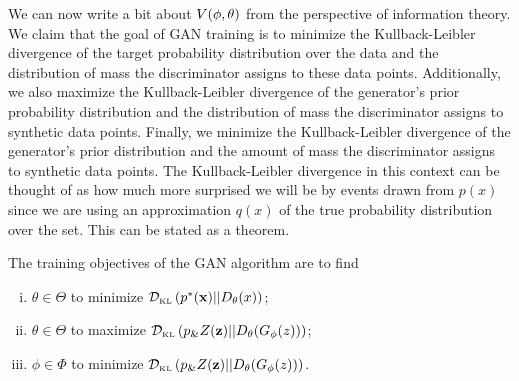We can now write a bit about $V(\phi, \theta)$ from the perspective of information
theory. We claim that the goal of GAN training is to minimize the
Kullback-Leibler divergence of the target probability distribution
over the data and the distribution of mass the discriminator assigns
to these data points.  Additionally, we also maximize the
Kullback-Leibler divergence of the generator's prior probability
distribution and the distribution of mass the discriminator assigns to
synthetic data points. Finally, we minimize the Kullback-Leibler
divergence of the generator's prior distribution and the amount of
mass the discriminator assigns to synthetic data points.  The
Kullback-Leibler divergence in this context can be thought of as how
much more surprised we will be by events drawn from $p(x)$ since we
are using an approximation $q(x)$ of the true probability distribution
over the set.  This can be stated as a theorem.

\begin{theorem}%
  \label{thm:info-objective}%
  The training objectives of the GAN algorithm are to find
  \begin{enumerate}[(i)]
  \item $\theta \in \Theta$ to minimize $\mathcal{D}_{\text{\tiny KL}}\left( p^*(\mathbf{x}) \middle| \middle| D_\theta(x) \right)$;
  \item $\theta \in \Theta$ to maximize $\mathcal{D}_{\text{\tiny KL}}\left( p_\&Z(\mathbf{z}) \middle| \middle| D_\theta(G_\phi(z)) \right)$;
  \item $\phi \in \Phi$ to minimize $\mathcal{D}_{\text{\tiny KL}}\left( p_\&Z(\mathbf{z}) \middle| \middle| D_\theta(G_\phi(z)) \right)$.
  \end{enumerate}
\end{theorem}

